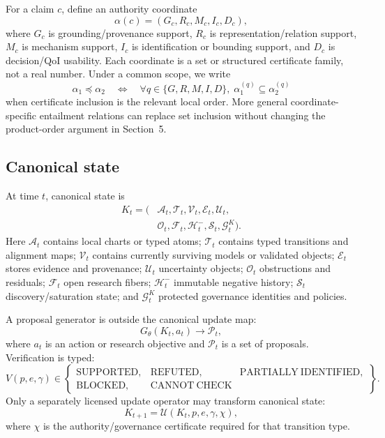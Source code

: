 \documentclass[11pt]{article}
\begin{document}
For a claim \(c\), define an authority coordinate
\[
\alpha(c)=(G_c,R_c,M_c,I_c,D_c),
\]
where \(G_c\) is grounding/provenance support, \(R_c\) is representation/relation support, \(M_c\) is mechanism support, \(I_c\) is identification or bounding support, and \(D_c\) is decision/QoI usability. Each coordinate is a set or structured certificate family, not a real number. Under a common scope, we write
\[
\alpha_1\preceq\alpha_2
\quad\Longleftrightarrow\quad
\forall q\in\{G,R,M,I,D\},\; \alpha_1^{(q)}\subseteq \alpha_2^{(q)}
\]
when certificate inclusion is the relevant local order. More general coordinate-specific entailment relations can replace set inclusion without changing the product-order argument in Section~5.

\subsection{Canonical state}

At time \(t\), canonical state is
\[
\begin{aligned}
K_t=(&\mathcal A_t,\mathcal T_t,\mathcal V_t,\mathcal E_t,\mathcal U_t,\\
     &\mathcal O_t,\mathcal F_t,\mathcal H_t^{-},\mathcal S_t,\mathcal G_t^K).
\end{aligned}
\]
Here \(\mathcal A_t\) contains local charts or typed atoms; \(\mathcal T_t\) contains typed transitions and alignment maps; \(\mathcal V_t\) contains currently surviving models or validated objects; \(\mathcal E_t\) stores evidence and provenance; \(\mathcal U_t\) uncertainty objects; \(\mathcal O_t\) obstructions and residuals; \(\mathcal F_t\) open research fibers; \(\mathcal H_t^{-}\) immutable negative history; \(\mathcal S_t\) discovery/saturation state; and \(\mathcal G_t^K\) protected governance identities and policies.

A proposal generator is outside the canonical update map:
\[
G_\theta(K_t,a_t)\longrightarrow \mathcal P_t,
\]
where \(a_t\) is an action or research objective and \(\mathcal P_t\) is a set of proposals. Verification is typed:
\[
V(p,e,\gamma)\in
\left\{
\begin{array}{lll}
\mathrm{SUPPORTED}, & \mathrm{REFUTED}, & \mathrm{PARTIALLY\ IDENTIFIED},\\
\mathrm{BLOCKED}, & \mathrm{CANNOT\ CHECK}
\end{array}
\right\}.
\]
Only a separately licensed update operator may transform canonical state:
\[
K_{t+1}=\mathcal U(K_t,p,e,\gamma,\chi),
\]
where \(\chi\) is the authority/governance certificate required for that transition type.
\end{document}
